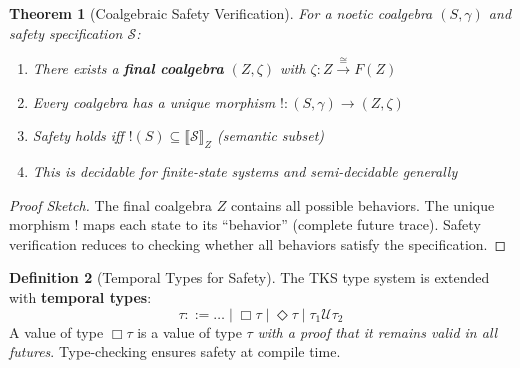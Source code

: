 \documentclass[11pt,twoside]{article}
\theoremstyle{definition}
\newtheorem{definition}{Definition}[section]
\theoremstyle{plain}
\newtheorem{theorem}[definition]{Theorem}
\theoremstyle{remark}
\newcommand{\sem}[1]{\llbracket #1 \rrbracket}
\newcommand{\SafetySpec}{\mathcal{S}}
\begin{document}
\begin{theorem}[Coalgebraic Safety Verification]
\label{thm:safety-verification}
For a noetic coalgebra $(S, \gamma)$ and safety specification $\SafetySpec$:
\begin{enumerate}
  \item There exists a \textbf{final coalgebra} $(Z, \zeta)$ with $\zeta : Z \xrightarrow{\cong} F(Z)$
  \item Every coalgebra has a unique morphism $! : (S, \gamma) \to (Z, \zeta)$
  \item Safety holds iff $!(S) \subseteq \sem{\SafetySpec}_Z$ (semantic subset)
  \item This is decidable for finite-state systems and semi-decidable generally
\end{enumerate}
\end{theorem}

\begin{proof}[Proof Sketch]
The final coalgebra $Z$ contains all possible behaviors. The unique morphism $!$
maps each state to its ``behavior'' (complete future trace). Safety verification
reduces to checking whether all behaviors satisfy the specification.
\end{proof}

\begin{definition}[Temporal Types for Safety]
\label{def:temporal-types}
The TKS type system is extended with \textbf{temporal types}:
\[
\tau ::= \ldots \mid \Box \tau \mid \Diamond \tau \mid \tau_1 \mathbin{\mathcal{U}} \tau_2
\]
A value of type $\Box \tau$ is a value of type $\tau$ \emph{with a proof that it
remains valid in all futures}. Type-checking ensures safety at compile time.
\end{definition}
\end{document}
